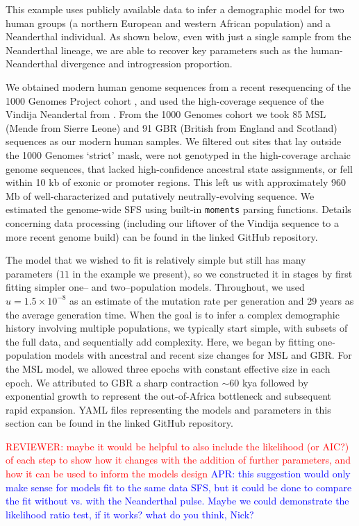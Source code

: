 \documentclass[]{article}
\newcommand{\aprcomment}[1]{{\textcolor{blue}{APR: #1}}}
\newcommand{\reviewercomment}[1]{{\textcolor{red}{REVIEWER: #1}}}
\newcommand{\moments}{\texttt{moments}\xspace}
\begin{document}
This example uses publicly available data to infer a demographic model for two
human groups (a northern European and western African population) and a
Neanderthal individual. As shown below, even with just a single sample from the
Neanderthal lineage, we are able to recover key parameters such as the
human-Neanderthal divergence and introgression proportion.

We obtained modern human genome sequences from a recent resequencing of the 
1000 Genomes Project cohort \cite{byrska2022high}, and used the high-coverage 
sequence of the Vindija Neandertal from \cite{prufer2017high}. 
From the 1000 Genomes cohort we took 85 MSL (Mende from Sierre Leone) and 91 
GBR (British from England and Scotland) sequences as our modern human samples.  
We filtered out sites that lay outside the 1000 Genomes `strict' mask, 
were not genotyped in the high-coverage archaic genome sequences, 
that lacked high-confidence ancestral state assignments, or fell within 10 kb of 
exonic or promoter regions. This left us with approximately 960 Mb of 
well-characterized and putatively neutrally-evolving sequence.
We estimated the genome-wide SFS using built-in \moments parsing functions.
Details concerning data processing (including our liftover of the Vindija 
sequence to a more recent genome build) can be found in the linked GitHub 
repository.

The model that we wished to fit is relatively simple but still has many 
parameters ($11$ in the example we present), so we constructed it in stages by 
first fitting simpler one-- and two--population models.
Throughout, we used $u=1.5\times 10^{-8}$ as an estimate of the mutation rate per 
generation and 29 years as the average generation time. When the goal is to infer
a complex demographic history involving multiple populations, we typically start
simple, with subsets of the full data, and sequentially add complexity.
Here, we began by fitting 
one-population models with ancestral and recent size changes for MSL and GBR.
For the MSL model, we allowed three epochs with constant effective size in each 
epoch. We attributed to GBR a sharp contraction $\sim$60 kya followed by 
exponential growth to represent the out-of-Africa bottleneck and subsequent 
rapid expansion. YAML files representing the models and parameters in this 
section can be found in the linked GitHub repository.

\reviewercomment{maybe it would be helpful to also include the likelihood (or AIC?) of each step to show how it changes with the addition of further parameters, and how it can be used to inform the models design}
\aprcomment{this suggestion would only make sense for models fit to the same data SFS, but it could be done to compare the fit without vs. with the Neanderthal pulse. Maybe we could demonstrate the likelihood ratio test, if it works? what do you think, Nick?}
\end{document}
